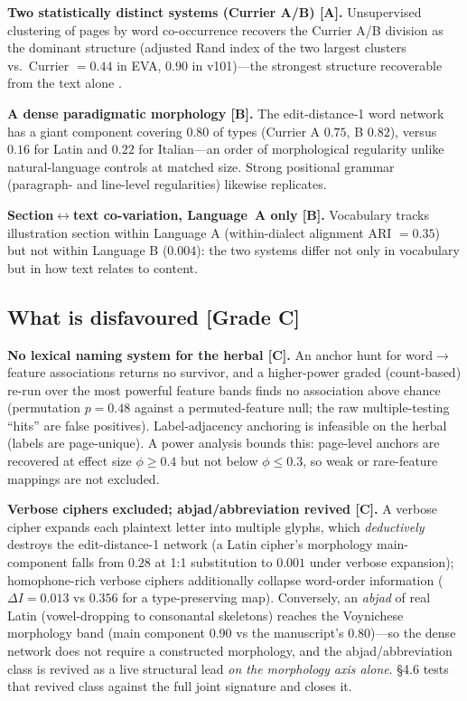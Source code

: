 \documentclass[11pt]{article}
\newcommand{\grade}[1]{{\small\textbf{[#1]}}}
\begin{document}
\textbf{Two statistically distinct systems (Currier A/B) \grade{A}.} Unsupervised
clustering of pages by word co-occurrence recovers the Currier A/B division as the
dominant structure (adjusted Rand index of the two largest clusters vs.\ Currier
$=0.44$ in EVA, $0.90$ in v101)---the strongest structure recoverable from the text
alone \citep{montemurro2013keywords}.

\textbf{A dense paradigmatic morphology \grade{B}.} The edit-distance-1 word network
has a giant component covering $0.80$ of types (Currier A $0.75$, B $0.82$), versus
$0.16$ for Latin and $0.22$ for Italian---an order of morphological regularity unlike
natural-language controls at matched size. Strong positional grammar (paragraph- and
line-level regularities) likewise replicates.

\textbf{Section$\leftrightarrow$text co-variation, Language~A only \grade{B}.}
Vocabulary tracks illustration section within Language A (within-dialect alignment ARI
$=0.35$) but not within Language B ($0.004$): the two systems differ not only in
vocabulary but in how text relates to content.

\subsection{What is disfavoured \grade{Grade C}}
\textbf{No lexical naming system for the herbal \grade{C}.} An anchor hunt for
word$\rightarrow$feature associations returns no survivor, and a higher-power graded
(count-based) re-run over the most powerful feature bands finds no association above
chance (permutation $p=0.48$ against a permuted-feature null; the raw multiple-testing
``hits'' are false positives). Label-adjacency anchoring is infeasible on the herbal
(labels are page-unique). A power analysis bounds this: page-level anchors are
recovered at effect size $\phi\geq 0.4$ but not below $\phi\leq 0.3$, so weak or
rare-feature mappings are not excluded.

\textbf{Verbose ciphers excluded; abjad/abbreviation revived \grade{C}.} A verbose
cipher expands each plaintext letter into multiple glyphs, which \emph{deductively}
destroys the edit-distance-1 network (a Latin cipher's morphology main-component falls
from $0.28$ at 1:1 substitution to $0.001$ under verbose expansion); homophone-rich
verbose ciphers additionally collapse word-order information ($\Delta I = 0.013$ vs
$0.356$ for a type-preserving map). Conversely, an \emph{abjad} of real Latin
(vowel-dropping to consonantal skeletons) reaches the Voynichese morphology band
(main component $0.90$ vs the manuscript's $0.80$)---so the dense network does not
require a constructed morphology, and the abjad/abbreviation class
\citep{hauer2016decoding} is revived as a live structural lead \emph{on the morphology
axis alone}. \S4.6 tests that revived class against the full joint signature and
closes it.
\end{document}
